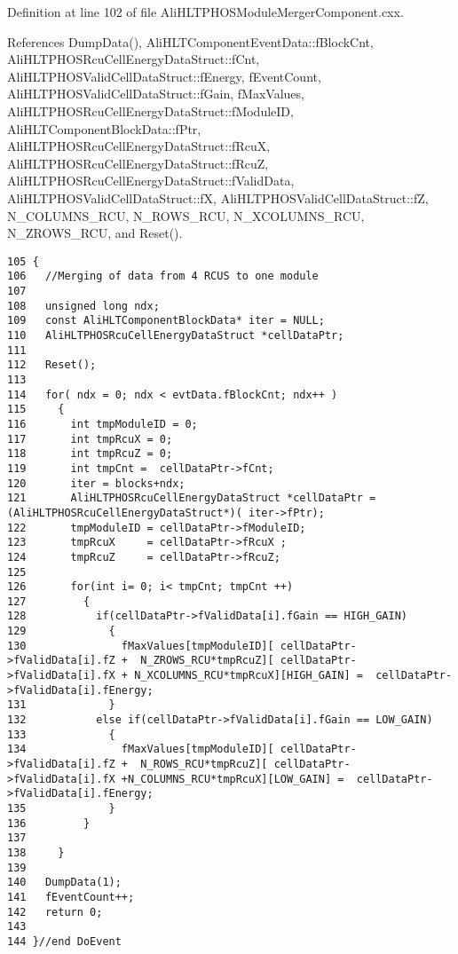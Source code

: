 Definition at line 102 of file Ali\-HLTPHOSModule\-Merger\-Component.cxx.

References Dump\-Data(), Ali\-HLTComponent\-Event\-Data::f\-Block\-Cnt, Ali\-HLTPHOSRcu\-Cell\-Energy\-Data\-Struct::f\-Cnt, Ali\-HLTPHOSValid\-Cell\-Data\-Struct::f\-Energy, f\-Event\-Count, Ali\-HLTPHOSValid\-Cell\-Data\-Struct::f\-Gain, f\-Max\-Values, Ali\-HLTPHOSRcu\-Cell\-Energy\-Data\-Struct::f\-Module\-ID, Ali\-HLTComponent\-Block\-Data::f\-Ptr, Ali\-HLTPHOSRcu\-Cell\-Energy\-Data\-Struct::f\-Rcu\-X, Ali\-HLTPHOSRcu\-Cell\-Energy\-Data\-Struct::f\-Rcu\-Z, Ali\-HLTPHOSRcu\-Cell\-Energy\-Data\-Struct::f\-Valid\-Data, Ali\-HLTPHOSValid\-Cell\-Data\-Struct::f\-X, Ali\-HLTPHOSValid\-Cell\-Data\-Struct::f\-Z, N\_\-COLUMNS\_\-RCU, N\_\-ROWS\_\-RCU, N\_\-XCOLUMNS\_\-RCU, N\_\-ZROWS\_\-RCU, and Reset().

\footnotesize\begin{verbatim}105 {
106   //Merging of data from 4 RCUS to one module
107   
108   unsigned long ndx;
109   const AliHLTComponentBlockData* iter = NULL;   
110   AliHLTPHOSRcuCellEnergyDataStruct *cellDataPtr;
111 
112   Reset();
113 
114   for( ndx = 0; ndx < evtData.fBlockCnt; ndx++ )
115     {
116       int tmpModuleID = 0;
117       int tmpRcuX = 0;
118       int tmpRcuZ = 0;
119       int tmpCnt =  cellDataPtr->fCnt;
120       iter = blocks+ndx;
121       AliHLTPHOSRcuCellEnergyDataStruct *cellDataPtr = (AliHLTPHOSRcuCellEnergyDataStruct*)( iter->fPtr);
122       tmpModuleID = cellDataPtr->fModuleID;
123       tmpRcuX     = cellDataPtr->fRcuX ;
124       tmpRcuZ     = cellDataPtr->fRcuZ;
125 
126       for(int i= 0; i< tmpCnt; tmpCnt ++)
127         {
128           if(cellDataPtr->fValidData[i].fGain == HIGH_GAIN)
129             {
130               fMaxValues[tmpModuleID][ cellDataPtr->fValidData[i].fZ +  N_ZROWS_RCU*tmpRcuZ][ cellDataPtr->fValidData[i].fX + N_XCOLUMNS_RCU*tmpRcuX][HIGH_GAIN] =  cellDataPtr->fValidData[i].fEnergy;
131             }
132           else if(cellDataPtr->fValidData[i].fGain == LOW_GAIN)
133             {
134               fMaxValues[tmpModuleID][ cellDataPtr->fValidData[i].fZ +  N_ROWS_RCU*tmpRcuZ][ cellDataPtr->fValidData[i].fX +N_COLUMNS_RCU*tmpRcuX][LOW_GAIN] =  cellDataPtr->fValidData[i].fEnergy;
135             }
136         }
137       
138     }
139 
140   DumpData(1);
141   fEventCount++; 
142   return 0;
143   
144 }//end DoEvent
\end{verbatim}\normalsize 


